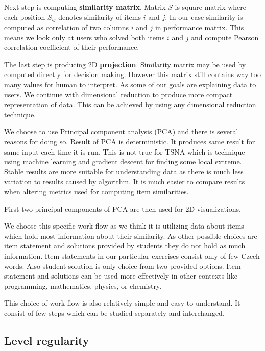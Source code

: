 \documentclass[
  digital, %
  table,   %
  nolof,     %
  nolot,     %
  nocover
]{fithesis3}
\begin{document}

Next step is computing \textbf{similarity matrix}. Matrix $S$ is square
matrix where each position $S_{ij}$ denotes similarity of items
$i$ and $j$. In our case similarity is computed as correlation of
two columns $i$ and $j$ in performance matrix. This means we look
only at users who solved both items $i$ and $j$ and compute
Pearson correlation coefficient of their performance.


The last step is producing 2D \textbf{projection}. Similarity matrix may be used by computed directly for decision making. However this matrix still contains way too many values for human to interpret. As some of our goals are explaining data to users. We continue with dimensional reduction to produce more compact representation of data. This can be
achieved by using any dimensional reduction technique.


We choose to use Principal component analysis (PCA) and there is several
reasons for doing so. Result of PCA is deterministic. It produces same
result for same input each time it is run. This is not true for TSNA which is technique
using machine learning and gradient descent for finding some local
extreme. Stable results are more suitable for understanding data as
there is much less variation to results caused by algorithm. It is much easier
to compare results when altering metrics used for computing item
similarities.

First two principal components of PCA are then used for 2D
visualizations.


We choose this specific work-flow as we think it is utilizing data about
items which hold most information about their similarity. As other
possible choices are item statement and solutions provided by students
they do not hold as much information. Item statements in our particular
exercises consist only of few Czech words. Also student solution is only
choice from two provided options. Item statement and solutions can be
used more effectively in other contexts like programming, mathematics,
physics, or chemistry.

This choice of work-flow is also relatively simple and easy to
understand. It consist of few steps which can be studied separately and
interchanged.

\subsection{Level regularity}\label{level-regularity}
\end{document}
